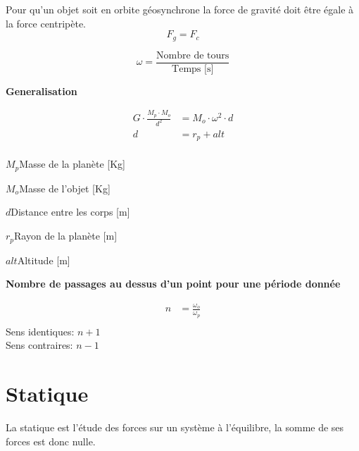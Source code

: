\documentclass[12pt,a4paper]{article} %
\begin{document}
\begin{mdframed}
	Pour qu'un objet soit en orbite géosynchrone la force de gravité doit être égale à la force centripète.
	\[F_g = F_c\]

	\[\omega = \frac{\text{Nombre de tours}}{\text{Temps [s]}}\]

	\textbf{Generalisation} \\
	\begin{twocols}
		\begin{align*}
			G\cdot\frac{M_p\cdot M_o}{d^2} &= M_o \cdot \omega^2 \cdot d \\
			d &= r_p + alt \\
		\end{align*}

	\nextcol

		\begin{vardef}
			\item{$M_p$}{Masse de la planète [Kg]}
			\item{$M_o$}{Masse de l'objet [Kg]}
			\item{$d$}{Distance entre les corps [m]}
			\item{$r_p$}{Rayon de la planète [m]}
			\item{$alt$}{Altitude [m]}
		\end{vardef}

	\end{twocols}

\end{mdframed}

\vspace{1em}

\begin{mdframed}
	\textbf{Nombre de passages au dessus d'un point pour une période donnée} \\

	\begin{twocols}
		\begin{align*}
		n &= \frac{\omega_o}{\omega_p} \\
	\end{align*}
	\nextcol
		Sens identiques: $n+1$ \\
		Sens contraires: $n-1$
	\end{twocols}
\end{mdframed}


\newpage

\section{Statique}
La statique est l'étude des forces sur un système à l'équilibre, la somme de ses forces est donc nulle.
\end{document}
